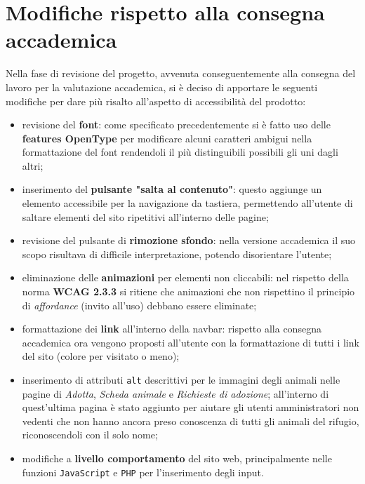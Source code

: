 \documentclass[a4paper,10pt]{article}
\begin{document}
	\section{Modifiche rispetto alla consegna accademica}
	Nella fase di revisione del progetto, avvenuta conseguentemente alla consegna del lavoro per la valutazione accademica, si è deciso di apportare le seguenti modifiche per dare più risalto all'aspetto di accessibilità del prodotto:
	\begin{itemize}
		\item revisione del \textbf{font}: come specificato precedentemente si è fatto uso delle \textbf{features OpenType} per modificare alcuni caratteri ambigui nella formattazione del font rendendoli il più distinguibili possibili gli uni dagli altri;
		\item inserimento del \textbf{pulsante "salta al contenuto"}: questo aggiunge un elemento accessibile per la navigazione da tastiera, permettendo all'utente di saltare elementi del sito ripetitivi all'interno delle pagine;
		\item revisione del pulsante di \textbf{rimozione sfondo}: nella versione accademica il suo scopo risultava di difficile interpretazione, potendo disorientare l'utente;
		\item eliminazione delle \textbf{animazioni} per elementi non cliccabili: nel rispetto della norma \textbf{WCAG 2.3.3} si ritiene che animazioni che non rispettino il principio di \textit{affordance} (invito all'uso) debbano essere eliminate;
		\item formattazione dei \textbf{link} all'interno della navbar: rispetto alla consegna accademica ora vengono proposti all'utente con la formattazione di tutti i link del sito (colore per visitato o meno);
		\item inserimento di attributi \texttt{alt} descrittivi per le immagini degli animali nelle pagine di \textit{Adotta}, \textit{Scheda animale} e \textit{Richieste di adozione}; all'interno di quest'ultima pagina è stato aggiunto per aiutare gli utenti amministratori non vedenti che non hanno ancora preso conoscenza di tutti gli animali del rifugio, riconoscendoli con il solo nome;
		\item modifiche a \textbf{livello comportamento} del sito web, principalmente nelle funzioni \texttt{JavaScript} e \texttt{PHP} per l'inserimento degli input.
	\end{itemize}
\end{document}
